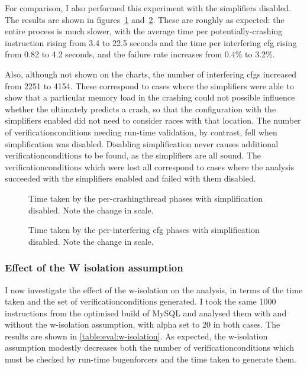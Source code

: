 For comparison, I also performed this experiment with the
{\StateMachine} simplifiers disabled.  The results are shown in
figures~\ref{fig:eval:time_breakdown:crashing_no_simple}
and~\ref{fig:eval:time_breakdown:interfering_no_simple}.  These are
roughly as expected: the entire process is much slower, with the
average time per potentially-crashing instruction rising from 3.4 to
22.5 seconds and the time per interfering \gls{cfg} rising from 0.82
to 4.2 seconds, and the failure rate increases from 0.4\% to 3.2\%.

Also, although not shown on the charts, the number of interfering
\glspl{cfg} increased from 2251 to 4154.  These correspond to cases
where the simplifiers were able to show that a particular memory load
in the crashing {\StateMachine} could not possible influence whether
the {\StateMachine} ultimately predicts a crash, so that the
configuration with the simplifiers enabled did not need to consider
races with that location.  The number of \glspl{verificationcondition}
needing run-time validation, by contrast, fell when simplification was
disabled.  Disabling simplification never causes additional
\glspl{verificationcondition} to be found, as the simplifiers are all
sound.  The \glspl{verificationcondition} which were lost all
correspond to cases where the analysis succeeded with the simplifiers
enabled and failed with them disabled.

\begin{figure}
  
  \caption{Time taken by the per-\gls{crashingthread} phases with
    {\StateMachine} simplification disabled.  Note the change in
    scale.}
  \label{fig:eval:time_breakdown:crashing_no_simple}
\end{figure}

\begin{figure}
  
  \caption{Time taken by the per-interfering \gls{cfg} phases with
    {\StateMachine} simplification disabled.  Note the change in
    scale.}
  \label{fig:eval:time_breakdown:interfering_no_simple}
\end{figure}

\subsubsection{Effect of the W isolation assumption}
\label{sect:eval:w_isolation}

I now investigate the effect of the \gls{w-isolation} on the analysis,
in terms of the time taken and the set of
\glspl{verificationcondition} generated.  I took the same 1000
instructions from the optimised build of MySQL and analysed them with
and without the \gls{w-isolation} assumption, with \gls{alpha} set to
20 in both cases.  The results are shown in
\autoref{table:eval:w-isolation}.  As expected, the \gls{w-isolation}
assumption modestly decreases both the number of
\glspl{verificationcondition} which must be checked by run-time
\glspl{bugenforcer} and the time taken to generate them.

